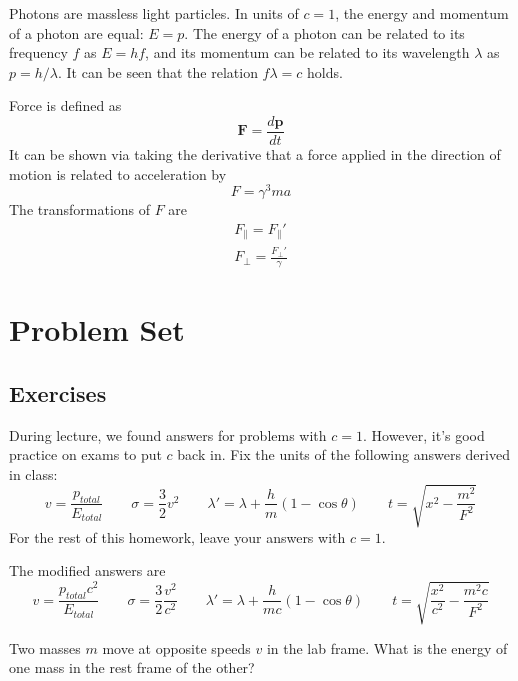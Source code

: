\documentclass[11pt]{scrartcl}
\begin{document}
\begin{defn}[Photons]
Photons are massless light particles. In units of $c=1$, the energy and momentum of a photon are equal: $E=p$. The energy of a photon can be related to its frequency $f$ as $E=hf$, and its momentum can be related to its wavelength $\lambda$ as $p=h/\lambda$. It can be seen that the relation $f\lambda=c$ holds. 
\end{defn}
\begin{defn}[Force]
Force is defined as $$\mathbf F=\frac{d\mathbf p}{dt}$$It can be shown via taking the derivative that a force applied in the direction of motion is related to acceleration by $$F=\gamma^3 ma$$The transformations of $F$ are \begin{gather*}F_\parallel=F_\parallel'\\
F_\perp = \frac{F_\perp'}{\gamma}\end{gather*}
\end{defn}

\section{Problem Set}

\subsection{Exercises}

\begin{prob}
    During lecture, we found answers for problems with $c=1$. However, it's good practice on exams to put $c$ back in. Fix the units of the following answers derived in class: $$v=\frac{p_{total}}{E_{total}}\qquad \sigma=\frac 32 v^2\qquad \lambda'=\lambda+\frac hm(1-\cos\theta)\qquad t=\sqrt{x^2-\frac{m^2}{F^2}}$$ 
    For the rest of this homework, leave your answers with $c=1$. 
\end{prob}

\begin{sol}
    The modified answers are $$v=\frac{p_{total}c^2}{E_{total}}\qquad \sigma=\frac 32 \frac{v^2}{c^2}\qquad \lambda'=\lambda+\frac h{mc}(1-\cos\theta)\qquad t=\sqrt{\frac{x^2}{c^2}-\frac{m^2c}{F^2}}$$ 
\end{sol}

\begin{prob}
    Two masses $m$ move at opposite speeds $v$ in the lab frame. What is the energy of one mass in the rest frame of the other?
\end{prob}
\end{document}
